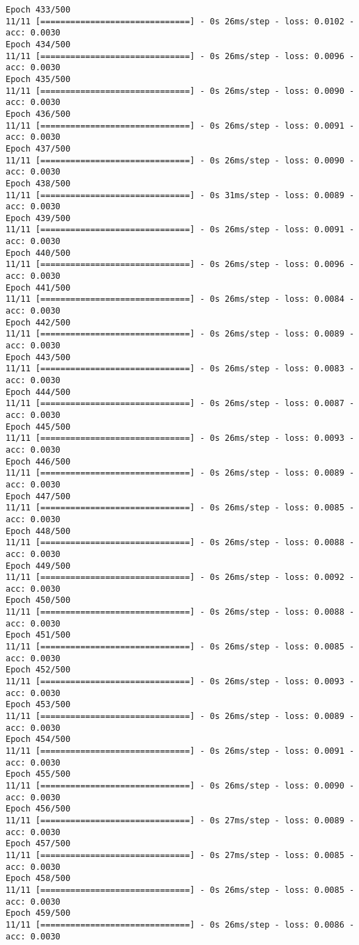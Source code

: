 \documentclass[11pt]{article}
\begin{document}
\begin{Verbatim}[commandchars=\\\{\}]
Epoch 433/500
11/11 [==============================] - 0s 26ms/step - loss: 0.0102 - acc: 0.0030
Epoch 434/500
11/11 [==============================] - 0s 26ms/step - loss: 0.0096 - acc: 0.0030
Epoch 435/500
11/11 [==============================] - 0s 26ms/step - loss: 0.0090 - acc: 0.0030
Epoch 436/500
11/11 [==============================] - 0s 26ms/step - loss: 0.0091 - acc: 0.0030
Epoch 437/500
11/11 [==============================] - 0s 26ms/step - loss: 0.0090 - acc: 0.0030
Epoch 438/500
11/11 [==============================] - 0s 31ms/step - loss: 0.0089 - acc: 0.0030
Epoch 439/500
11/11 [==============================] - 0s 26ms/step - loss: 0.0091 - acc: 0.0030
Epoch 440/500
11/11 [==============================] - 0s 26ms/step - loss: 0.0096 - acc: 0.0030
Epoch 441/500
11/11 [==============================] - 0s 26ms/step - loss: 0.0084 - acc: 0.0030
Epoch 442/500
11/11 [==============================] - 0s 26ms/step - loss: 0.0089 - acc: 0.0030
Epoch 443/500
11/11 [==============================] - 0s 26ms/step - loss: 0.0083 - acc: 0.0030
Epoch 444/500
11/11 [==============================] - 0s 26ms/step - loss: 0.0087 - acc: 0.0030
Epoch 445/500
11/11 [==============================] - 0s 26ms/step - loss: 0.0093 - acc: 0.0030
Epoch 446/500
11/11 [==============================] - 0s 26ms/step - loss: 0.0089 - acc: 0.0030
Epoch 447/500
11/11 [==============================] - 0s 26ms/step - loss: 0.0085 - acc: 0.0030
Epoch 448/500
11/11 [==============================] - 0s 26ms/step - loss: 0.0088 - acc: 0.0030
Epoch 449/500
11/11 [==============================] - 0s 26ms/step - loss: 0.0092 - acc: 0.0030
Epoch 450/500
11/11 [==============================] - 0s 26ms/step - loss: 0.0088 - acc: 0.0030
Epoch 451/500
11/11 [==============================] - 0s 26ms/step - loss: 0.0085 - acc: 0.0030
Epoch 452/500
11/11 [==============================] - 0s 26ms/step - loss: 0.0093 - acc: 0.0030
Epoch 453/500
11/11 [==============================] - 0s 26ms/step - loss: 0.0089 - acc: 0.0030
Epoch 454/500
11/11 [==============================] - 0s 26ms/step - loss: 0.0091 - acc: 0.0030
Epoch 455/500
11/11 [==============================] - 0s 26ms/step - loss: 0.0090 - acc: 0.0030
Epoch 456/500
11/11 [==============================] - 0s 27ms/step - loss: 0.0089 - acc: 0.0030
Epoch 457/500
11/11 [==============================] - 0s 27ms/step - loss: 0.0085 - acc: 0.0030
Epoch 458/500
11/11 [==============================] - 0s 26ms/step - loss: 0.0085 - acc: 0.0030
Epoch 459/500
11/11 [==============================] - 0s 26ms/step - loss: 0.0086 - acc: 0.0030

\end{Verbatim}
\end{document}
